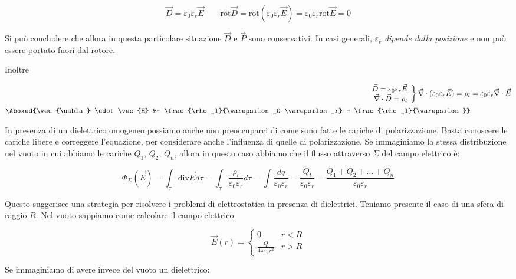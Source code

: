 \[
	\vec{D} =\varepsilon_0 \varepsilon_r \vec{E} \qquad \text{rot}\vec{D} = \text{rot}(\varepsilon_0 \varepsilon_r \vec{E} ) = \varepsilon_0 \varepsilon_r \text{rot}\vec{E} = 0
\]

Si può concludere che allora in questa particolare situazione $\vec{D}$ e $\vec{P}$ sono conservativi. In casi generali, $\varepsilon_r$ \emph{dipende dalla posizione} e non può essere portato fuori dal rotore.

Inoltre

\begin{align*}
	\left. \begin{array}{r}
	 	\vec{D} =\varepsilon_0 \varepsilon_r \vec{E} \\
		\vec{\nabla} \cdot \vec{D} = \rho_l
	\end{array} \right\} \vec{\nabla} \cdot (\varepsilon_0 \varepsilon_r \vec{E} ) = \rho_l  &= \varepsilon_0 \varepsilon_r \vec{\nabla} \cdot \vec{E} \\
	\Aboxed{\vec{\nabla} \cdot \vec{E} &= \frac{\rho_l}{\varepsilon_0 \varepsilon_r} = \frac{\rho_l}{\varepsilon}}
\end{align*}

In presenza di un dielettrico omogeneo possiamo anche non preoccuparci di come sono fatte le cariche di polarizzazione. Basta conoscere le cariche libere e correggere l'equazione, per considerare anche l'influenza di quelle di polarizzazione.
Se immaginiamo la stessa distribuzione nel vuoto in cui abbiamo le cariche $ Q_1  $, $ Q_2  $, $ Q_n  $, allora in questo caso abbiamo che il flusso attraverso $\Sigma$ del campo elettrico è:

\[
	\Phi_{\Sigma}(\vec{E} ) = \int_{\tau}\text{div}\vec{E} d\tau = \int_{\tau}\frac{\rho_l}{\varepsilon_0 \varepsilon_r} d\tau = \int \frac{dq}{\varepsilon_0 \varepsilon_r} = \frac{Q_l}{\varepsilon_0 \varepsilon_r} = \frac{Q_1 + Q_2 + \ldots + Q_n}{\varepsilon_0 \varepsilon_r}
\]

Questo suggerisce una strategia per risolvere i problemi di elettrostatica in presenza di dielettrici.
Teniamo presente il caso di una sfera di raggio $R$. Nel vuoto sappiamo come calcolare il campo elettrico:

\[
	\vec{E} (r) = \left\{ \begin{array}{ll}
	 	0 & r<R \\
		\frac{Q}{4\pi \varepsilon_0 r^2} & r>R
	\end{array} \right.
\]

Se immaginiamo di avere invece del vuoto un dielettrico:


